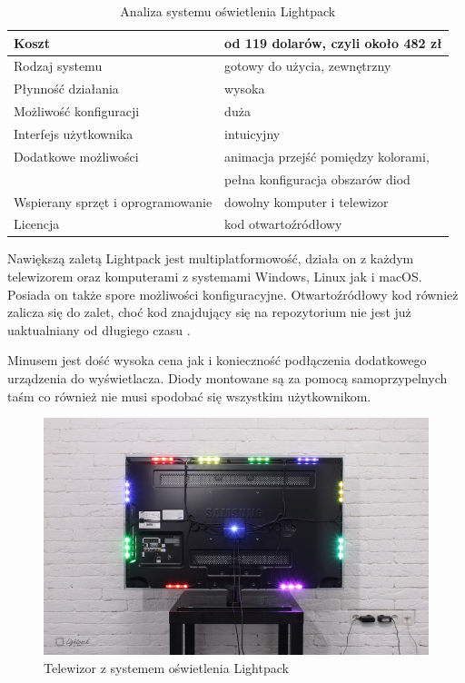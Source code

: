 \documentclass[12pt]{report}
\begin{document}
\begin{table}[h]
\centering
\begin{tabular}{| l | l |} 
\hline 
Koszt & od 119 dolarów, czyli około 482 zł \\ \hline
Rodzaj systemu & gotowy do użycia, zewnętrzny \\ \hline
Płynność działania & wysoka \\ \hline
Możliwość konfiguracji & duża  \\ \hline
Interfejs użytkownika & intuicyjny  \\ \hline
Dodatkowe możliwości &  animacja przejść pomiędzy kolorami, \\ \hline
& pełna konfiguracja obszarów diod \\ \hline
Wspierany sprzęt i oprogramowanie &  dowolny komputer i telewizor   \\ \hline
Licencja & kod otwartoźródłowy  \\ \hline
\end{tabular} 
\caption{Analiza systemu oświetlenia Lightpack}
\end{table}

Nawiększą zaletą Lightpack jest multiplatformowość, działa on z każdym telewizorem oraz komputerami z systemami Windows, Linux jak i macOS. Posiada on także spore możliwości konfiguracyjne. Otwartoźródłowy kod również zalicza się do zalet, choć kod znajdujący się na repozytorium nie jest już uaktualniany od długiego czasu \cite{legacy}.

Minusem jest dość wysoka cena jak i konieczność podłączenia dodatkowego urządzenia do wyświetlacza. Diody montowane są za pomocą samoprzypelnych taśm co również nie musi spodobać się wszystkim użytkownikom.

\begin{figure}[h]
\centering
\includegraphics[width=\textwidth]{../resources/lightpackm.jpg}
\caption[Telewizor z systemem oświetlenia Lightpack]{Telewizor z systemem oświetlenia Lightpack \cite{lps}}
\end{figure}
\end{document}
